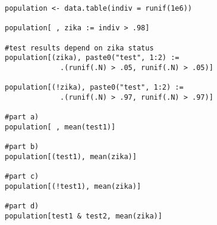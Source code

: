 \documentclass{article}
\begin{document}
\begin{lstlisting}
population <- data.table(indiv = runif(1e6))

population[ , zika := indiv > .98]

#test results depend on zika status
population[(zika), paste0("test", 1:2) :=
             .(runif(.N) > .05, runif(.N) > .05)]

population[(!zika), paste0("test", 1:2) :=
             .(runif(.N) > .97, runif(.N) > .97)]

#part a)
population[ , mean(test1)]

#part b)
population[(test1), mean(zika)]

#part c)
population[(!test1), mean(zika)]

#part d)
population[test1 & test2, mean(zika)]
\end{lstlisting}
\end{document}
